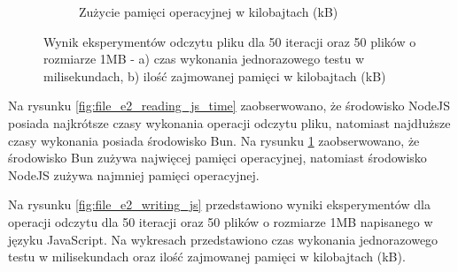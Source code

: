 \begin{figure}[H]
\begin{subfigure}[b]{0.42\textwidth}
    \caption{Zużycie pamięci operacyjnej w kilobajtach (kB)}
    \label{fig:file_e2_reading_js_memory}
  \end{subfigure}
  \caption{Wynik eksperymentów odczytu pliku dla 50 iteracji oraz 50 plików o rozmiarze 1MB - a) czas wykonania jednorazowego testu w milisekundach, b) ilość zajmowanej pamięci w kilobajtach (kB)}
  \label{fig:file_e2_reading_js}
\end{figure}

Na rysunku \ref{fig:file_e2_reading_js_time} zaobserwowano, że środowisko NodeJS posiada najkrótsze czasy wykonania operacji odczytu pliku, natomiast najdłuższe czasy wykonania posiada środowisko Bun. Na rysunku \ref{fig:file_e2_reading_js_memory} zaobserwowano, że środowisko Bun zużywa najwięcej pamięci operacyjnej, natomiast środowisko NodeJS zużywa najmniej pamięci operacyjnej.

Na rysunku \ref{fig:file_e2_writing_js} przedstawiono wyniki eksperymentów dla operacji odczytu dla 50 iteracji oraz 50 plików o rozmiarze 1MB napisanego w języku JavaScript. Na wykresach przedstawiono czas wykonania jednorazowego testu w milisekundach oraz ilość zajmowanej pamięci w kilobajtach (kB).

